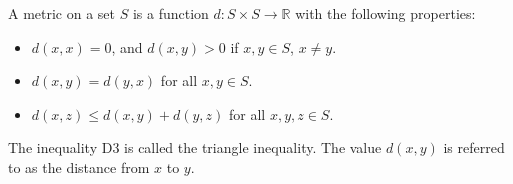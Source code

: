 A metric on a set $S$ is a function $d: S \times S \to \mathbb{R}$ with the following properties:

\begin{itemize}
\item[D1.] $d(x, x) = 0$, and $d(x, y) > 0$ if $x, y \in S$, $x \neq y$.
\item[D2.] $d(x, y) = d(y, x)$ for all $x, y \in S$.
\item[D3.] $d(x, z) \leq d(x, y) + d(y, z)$ for all $x, y, z \in S$.
\end{itemize}

The inequality D3 is called the triangle inequality. The value $d(x, y)$ is referred to as the distance from $x$ to $y$.
